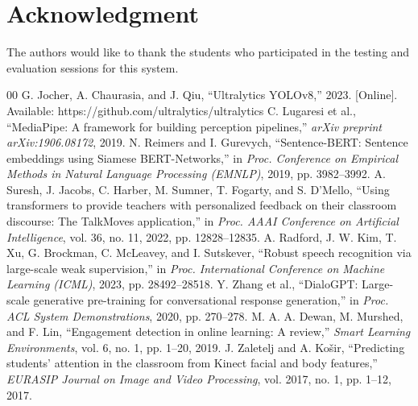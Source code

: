 \documentclass[conference]{IEEEtran}
\begin{document}
\section*{Acknowledgment}
The authors would like to thank the students who participated in the testing and evaluation sessions for this system.
\begin{thebibliography}{00}
 G. Jocher, A. Chaurasia, and J. Qiu, ``Ultralytics YOLOv8,'' 2023. [Online]. Available: https://github.com/ultralytics/ultralytics
 C. Lugaresi et al., ``MediaPipe: A framework for building perception pipelines,'' \emph{arXiv preprint arXiv:1906.08172}, 2019.
 N. Reimers and I. Gurevych, ``Sentence-BERT: Sentence embeddings using Siamese BERT-Networks,'' in \emph{Proc. Conference on Empirical Methods in Natural Language Processing (EMNLP)}, 2019, pp. 3982--3992.
 A. Suresh, J. Jacobs, C. Harber, M. Sumner, T. Fogarty, and S. D'Mello, ``Using transformers to provide teachers with personalized feedback on their classroom discourse: The TalkMoves application,'' in \emph{Proc. AAAI Conference on Artificial Intelligence}, vol. 36, no. 11, 2022, pp. 12828--12835.
 A. Radford, J. W. Kim, T. Xu, G. Brockman, C. McLeavey, and I. Sutskever, ``Robust speech recognition via large-scale weak supervision,'' in \emph{Proc. International Conference on Machine Learning (ICML)}, 2023, pp. 28492--28518.
 Y. Zhang et al., ``DialoGPT: Large-scale generative pre-training for conversational response generation,'' in \emph{Proc. ACL System Demonstrations}, 2020, pp. 270--278.
 M. A. A. Dewan, M. Murshed, and F. Lin, ``Engagement detection in online learning: A review,'' \emph{Smart Learning Environments}, vol. 6, no. 1, pp. 1--20, 2019.
 J. Zaletelj and A. Ko\v{s}ir, ``Predicting students' attention in the classroom from Kinect facial and body features,'' \emph{EURASIP Journal on Image and Video Processing}, vol. 2017, no. 1, pp. 1--12, 2017.
\end{thebibliography}
\end{document}
